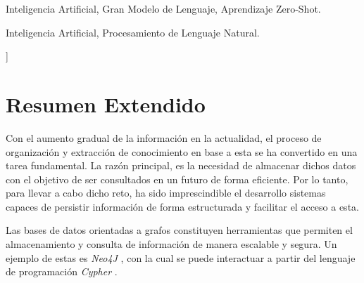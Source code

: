 \documentclass[a4paper,10pt,twocolumn]{article}
\begin{document}
\begin{keywords}
	Inteligencia Artificial,
	Gran Modelo de Lenguaje,
	Aprendizaje Zero-Shot.
\end{keywords}

\begin{topics}
	Inteligencia Artificial, Procesamiento de Lenguaje Natural.
\end{topics}


\vspace{0.8cm}
]


\section{Resumen Extendido}\label{sec:intro}
Con el aumento gradual de la información en la actualidad, el proceso de organización y extracción de conocimiento en base a esta se ha convertido en una tarea fundamental. La razón principal, es la necesidad de almacenar dichos datos con el objetivo de ser consultados en un futuro de forma eficiente. Por lo tanto, para llevar a cabo dicho reto, ha sido imprescindible el desarrollo sistemas capaces de persistir información de forma estructurada y facilitar el acceso a esta.

Las bases de datos orientadas a grafos \cite{graph_dbs} constituyen herramientas que permiten el almacenamiento y consulta de información de manera escalable y segura. Un ejemplo de estas es \textit{Neo4J} \cite{neo4j}, con la cual se puede interactuar a partir del lenguaje de programación \textit{Cypher} \cite{cypher}.
\end{document}
